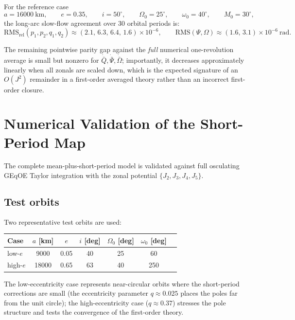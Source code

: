 \documentclass[11pt]{article}
\begin{document}
For the reference case
\[
a=16000\ \mathrm{km},\qquad
e=0.35,\qquad
i=50^\circ,\qquad
\Omega_0=25^\circ,\qquad
\omega_0=40^\circ,\qquad
M_0=30^\circ,
\]
the long-arc slow-flow agreement over $30$ orbital periods is:
\begin{equation}
\mathrm{RMS}_{\mathrm{rel}}(p_1,p_2,q_1,q_2)
\approx
(2.1,\,6.3,\,6.4,\,1.6)\times 10^{-6},
\qquad
\mathrm{RMS}(\Psi,\Omega)
\approx
(1.6,\,3.1)\times 10^{-6}\ \mathrm{rad}.
\end{equation}

The remaining pointwise parity gap against the \emph{full} numerical
one-revolution average is small but nonzero for
$\dot{\bar Q},\dot{\bar\Psi},\dot{\bar\Omega}$; importantly, it decreases
approximately linearly when all zonals are scaled down, which is the expected
signature of an $O(J^2)$ remainder in a first-order averaged theory rather than
an incorrect first-order closure.

\section{Numerical Validation of the Short-Period Map}
\label{sec:validation}

The complete mean-plus-short-period model is validated against full osculating
GEqOE Taylor integration with the zonal potential $\{J_2, J_3, J_4, J_5\}$.

\subsection{Test orbits}

Two representative test orbits are used:
\begin{center}
\begin{tabular}{lcccccc}
\toprule
Case & $a$ [km] & $e$ & $i$ [deg] & $\Omega_0$ [deg] & $\omega_0$ [deg] \\
\midrule
low-$e$ & 9000 & 0.05 & 40 & 25 & 60 \\
high-$e$ & 18000 & 0.65 & 63 & 40 & 250 \\
\bottomrule
\end{tabular}
\end{center}
The low-eccentricity case represents near-circular orbits where the
short-period corrections are small (the eccentricity parameter $q \approx 0.025$
places the poles far from the unit circle); the high-eccentricity case
($q \approx 0.37$) stresses the pole structure and tests the convergence of
the first-order theory.
\end{document}
